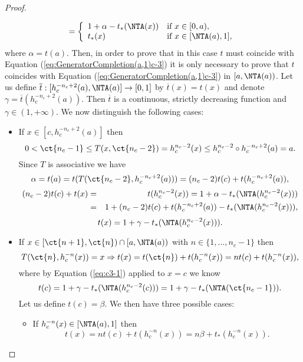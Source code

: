 \begin{proof}
\begin{enumerate}[label=(\roman*)]
\begin{itemize}
$$			=
			\left\{ \begin{array}{ll}
				1+\alpha-t_{*}(\NTA(x)) & \text{if } x \in [0,a), \\
				t_{*}(x) & \text{if } x \in [\NTA(a),1],
			\end{array} \right.
			$$
			where $\alpha=t(a)$. Then, in order to prove that in this case $t$ must coincide with Equation (\ref{eq:GeneratorCompletion(a,1)c-3}) it is only necessary to prove that $t$ coincides with Equation (\ref{eq:GeneratorCompletion(a,1)c-3}) in $[a,\NTA(a))$. Let us define $\overline{t}: [h_c^{-n_c+2}(a),\NTA(a)] \to [0,1]$ by $\overline{t}(x)=t(x)$  and denote $\gamma=\overline{t}(h_c^{-n_c+2}(a))$. Then $\overline{t}$ is a continuous, strictly decreasing function and  $\gamma \in (1,+\infty)$. We now distinguish the following cases:
			\begin{itemize}
				\item If $x \in [c,h_c^{-n_c+2}(a)]$ then
				$$0<\ct{n_c-1} \leq T(x,\ct{n_c-2}) = h_c^{n_c-2}(x) \leq h_c^{n_c-2} \circ h_c^{-n_c+2}(a)=a.$$
				Since $T$ is associative we have
				\begin{equation}\label{eq:alpha:c3}
					\alpha = t(a)= t(T(\ct{n_c-2},h_c^{-n_c+2}(a))) = (n_c-2)t(c) + t(h_c^{-n_c+2}(a)),
				\end{equation}
				\begin{eqnarray*}
					(n_c-2)t(c) + t(x) &=&  t(h_c^{n_c-2}(x)) = 1 + \alpha-t_*(\NTA(h_c^{n_c-2}(x))) \\
					&=& 1 + (n_c-2)t(c) + t(h_c^{-n_c+2}(a))-t_*(\NTA(h_c^{n_c-2}(x))),
				\end{eqnarray*}
				\begin{equation}\label{eq:c3-1}
					t(x)=1 + \gamma-t_*(\NTA(h_c^{n_c-2}(x))).
				\end{equation}
				\item If $x \in [\ct{n+1},\ct{n}) \cap [a,\NTA(a))$ with $n \in \{1,\dots,n_c-1\}$ then
				$$T(\ct{n},h_c^{-n}(x))=x \Rightarrow t(x) = t(\ct{n}) + t(h_c^{-n}(x)) = nt(c)+ t(h_c^{-n}(x)),$$
				where by Equation (\ref{eq:c3-1})  applied to $x=c$  we know
				\begin{equation}\label{eq:beta:c3}
					t(c) = 1 + \gamma-t_*(\NTA(h_c^{n_c-2}(c))) = 1 + \gamma-t_*(\NTA(\ct{n_c-1})).
				\end{equation}
				Let us define $t(c) = \beta$. We then have three possible cases:
				\begin{itemize}
					\item  If $h_c^{-n}(x) \in [\NTA(a),1]$ then
					$$ t(x) = nt(c)+ t(h_c^{-n}(x)) = n\beta+ t_*(h_c^{-n}(x)).$$

\end{itemize}
\end{itemize}
\end{itemize}
\end{enumerate}
\end{proof}
